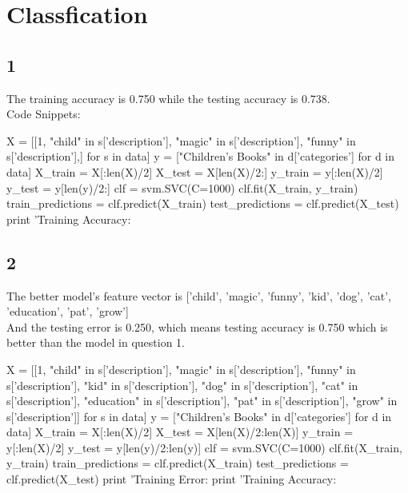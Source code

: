 \documentclass [11pt, a4paper, oneside] {article}
\begin{document}
\section *{Classfication}
\subsection *{1}
The training accuracy is 0.750 while the testing accuracy is 0.738.\\
Code Snippets:
\begin{python}
X = [[1, "child" in s['description'],
         "magic" in s['description'],
         "funny" in s['description'],] for s in data]
y = ["Children's Books" in d['categories'] for d in data]
X_train = X[:len(X)/2]
X_test = X[len(X)/2:]
y_train = y[:len(X)/2]
y_test = y[len(y)/2:]
clf = svm.SVC(C=1000)
clf.fit(X_train, y_train)
train_predictions = clf.predict(X_train)
test_predictions = clf.predict(X_test)
print 'Training Accuracy:%
\end{python}
\subsection *{2}
The better model's feature vector is ['child', 'magic', 'funny', 'kid', 'dog', 'cat', 'education', 'pat', 'grow'] \\
And the testing error is 0.250, which means testing accuracy is 0.750 which is better than the model in question 1.\\
\begin{python}
X = [[1, "child" in s['description'],
         "magic" in s['description'],
         "funny" in s['description'],
         "kid" in s['description'],
         "dog" in s['description'],
         "cat" in s['description'],
         "education" in s['description'],
         "pat" in s['description'],
         "grow" in s['description']] for s in data]
y = ["Children's Books" in d['categories'] for d in data]
X_train = X[:len(X)/2]
X_test = X[len(X)/2:len(X)]
y_train = y[:len(X)/2]
y_test = y[len(y)/2:len(y)]
clf = svm.SVC(C=1000)
clf.fit(X_train, y_train)
train_predictions = clf.predict(X_train)
test_predictions = clf.predict(X_test)
print 'Training Error:%
print 'Training Accuracy:%
\end{python}
\end{document}

